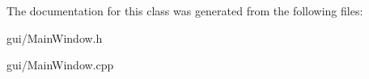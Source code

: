 The documentation for this class was generated from the following files\+:\begin{DoxyCompactItemize}
\item 
gui/Main\+Window.\+h\item 
gui/Main\+Window.\+cpp\end{DoxyCompactItemize}
